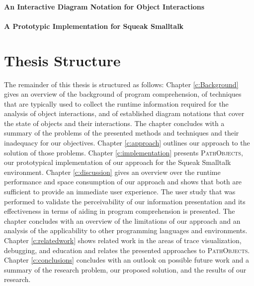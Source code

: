 \paragraph{An Interactive Diagram Notation for Object Interactions}
\paragraph{A Prototypic Implementation for Squeak Smalltalk}

\section{Thesis Structure}
The remainder of this thesis is structured as follows:
Chapter \ref{c:Background} gives an overview of the background of program comprehension, of techniques that are typically used to collect the runtime information required for the analysis of object interactions, and of established diagram notations that cover the state of objects and their interactions.
The chapter concludes with a summary of the problems of the presented methods and techniques and their inadequacy for our objectives.
Chapter \ref{c:approach} outlines our approach to the solution of those problems.
Chapter \ref{c:implementation} presents \textsc{PathObjects}, our prototypical implementation of our approach for the Squeak Smalltalk environment.
Chapter \ref{c:discussion} gives an overview over the runtime performance and space consumption of our approach and shows that both are sufficient to provide an immediate user experience.
The user study that was performed to validate the perceivability of our information presentation and its effectiveness in terms of aiding in program comprehension is presented.
The chapter concludes with an overview of the limitations of our approach and an analysis of the applicability to other programming languages and environments.
Chapter \ref{c:relatedwork} shows related work in the areas of trace visualization, debugging, and education and relates the presented approaches to \textsc{PathObjects}.
Chapter \ref{c:conclusions} concludes with an outlook on possible future work and a summary of the research problem, our proposed solution, and the results of our research.